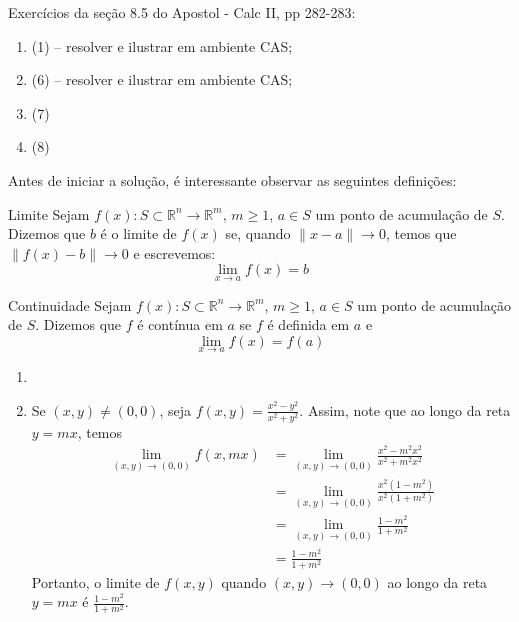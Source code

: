 \documentclass[../main.tex]{subfiles}
\begin{document}
		\begin{exercicio}{4}
			Exercícios da seção 8.5 do Apostol - Calc II, pp 282-283:
			\begin{enumerate}[label=\alph*)]
				\item (1) -- resolver e ilustrar em ambiente CAS;
				\item (6) -- resolver e ilustrar em ambiente CAS;
				\item (7)
				\item (8)
			\end{enumerate}
		\end{exercicio}
		\begin{solucao}
			Antes de iniciar a solução, é interessante observar as seguintes definições:
			\begin{definicao}{Limite}
				Sejam $f(x)\colon S\subset \mathbb{R}^n\to \mathbb{R}^m$, $m\geq 1$, $a\in S$ um ponto de acumulação de $S$. Dizemos que $b$ é o limite de $f(x)$ se, quando $\|x-a\|\to 0$, temos que $\|f(x)-b\|\to 0$ e escrevemos:
				\[
				\lim_{x\to a}f(x)=b
				\]
			\end{definicao}
			\begin{definicao}{Continuidade}
				Sejam $f(x)\colon S\subset \mathbb{R}^n\to \mathbb{R}^m$, $m\geq 1$, $a\in S$ um ponto de acumulação de $S$. Dizemos que $f$ é contínua em $a$ se $f$ é definida em $a$ e
				\[
				\lim_{x\to a}f(x)=f(a)
				\]
			\end{definicao}
			\begin{enumerate}[label=\alph*)]
				\item 
				\item Se $(x,y)\neq (0,0)$, seja $f(x,y)=\tfrac{x^2-y^2}{x^2+y^2}$.
				Assim, note que ao longo da reta $y=mx$, temos
				\begin{align*}
					\lim_{(x,y)\to (0,0)} f(x,mx)
					&=\lim_{(x,y)\to (0,0)} \frac{x^2-m^2x^2}{x^2+m^2x^2}\\
					&=\lim_{(x,y)\to (0,0)}\frac{x^2(1-m^2)}{x^2(1+m^2)}\\
					&=\lim_{(x,y)\to (0,0)}\frac{1-m^2}{1+m^2}\\
					&=\frac{1-m^2}{1+m^2}
				\end{align*}
				Portanto, o limite de $f(x,y)$ quando $(x,y)\to (0,0)$ ao longo da reta $y=mx$ é $\tfrac{1-m^2}{1+m^2}$.
				

\end{enumerate}
\end{solucao}
\end{document}
